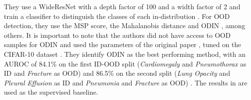 They use a WideResNet \citep{Zagoruyko2016} with a depth factor of 100 and a width factor of 2 and train a classifier to distinguish the classes of each in-distribution \citep{Berger2021}.
For OOD detection, they use the MSP score, the Mahalanobis distance and ODIN \citep{Berger2021}, among others.
It is important to note that the authors did not have access to OOD samples for ODIN and used the parameters of the original paper \citep{Liang2018}, tuned on the CIFAR-10 dataset \citep{Krizhevsky2009b}.
They identify ODIN as the best performing method, with an AUROC of 84.1\% on the first ID-OOD split (\textit{Cardiomegaly} and \textit{Pneumothorax} as ID and \textit{Fracture} as OOD) and 86.5\% on the second split (\textit{Lung Opacity} and \textit{Pleural Effusion} as ID and \textit{Pneumonia} and \textit{Fracture} as OOD) \citep{Berger2021}.
The results in \citep{Berger2021} are used as the supervised baseline.
\par
